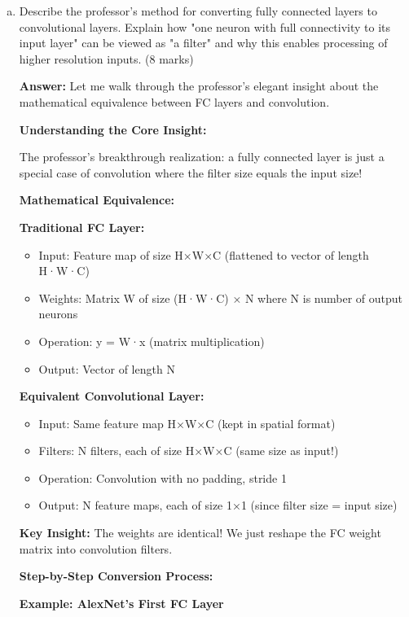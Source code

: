 \documentclass[12pt]{article}
\newcommand{\answer}[1]{{\color{answercolor}\textbf{Answer:} #1}}
\newcommand{\explanation}[1]{{\color{explanationcolor}#1}}
\begin{document}
\begin{enumerate}[(a)]
    \item Describe the professor's method for converting fully connected layers to convolutional layers. Explain how "one neuron with full connectivity to its input layer" can be viewed as "a filter" and why this enables processing of higher resolution inputs. \hfill (8 marks)
    
    \answer{
    Let me walk through the professor's elegant insight about the mathematical equivalence between FC layers and convolution.
    
    \textbf{Understanding the Core Insight:}
    
    \explanation{
    The professor's breakthrough realization: a fully connected layer is just a special case of convolution where the filter size equals the input size!
    }
    
    \textbf{Mathematical Equivalence:}
    
    \explanation{
    \textbf{Traditional FC Layer:}
    \begin{itemize}
        \item Input: Feature map of size H×W×C (flattened to vector of length H·W·C)
        \item Weights: Matrix W of size (H·W·C) × N where N is number of output neurons
        \item Operation: y = W·x (matrix multiplication)
        \item Output: Vector of length N
    \end{itemize}
    
    \textbf{Equivalent Convolutional Layer:}
    \begin{itemize}
        \item Input: Same feature map H×W×C (kept in spatial format)
        \item Filters: N filters, each of size H×W×C (same size as input!)
        \item Operation: Convolution with no padding, stride 1
        \item Output: N feature maps, each of size 1×1 (since filter size = input size)
    \end{itemize}
    
    \textbf{Key Insight:} The weights are identical! We just reshape the FC weight matrix into convolution filters.
    }
    
    \textbf{Step-by-Step Conversion Process:}
    
    \explanation{
    \textbf{Example: AlexNet's First FC Layer}
    
}}
\end{enumerate}
\end{document}

